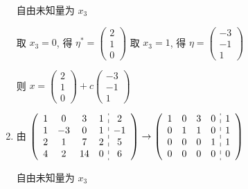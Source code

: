 \begin{enumerate}
                   自由未知量为 \( x_{3} \)

                   取 \( x_{3} = 0 \), 得 \( \eta^{*} = \begin{pmatrix}
                       2 \\
                       1 \\
                       0
                   \end{pmatrix} \) 取 \( x_{3} = 1 \), 得 \( \eta = \begin{pmatrix}
                       -3 \\
                       -1 \\
                       1
                   \end{pmatrix} \)

                   则 \( x = \begin{pmatrix}
                       2 \\
                       1 \\
                       0
                   \end{pmatrix} + c\begin{pmatrix}
                       -3 \\
                       -1 \\
                       1
                   \end{pmatrix} \)
             \item %
                   由 \( \left(\begin{array}{cccc:c}
                           1 & 0  & 3  & 1 & 2  \\
                           1 & -3 & 0  & 1 & -1 \\
                           2 & 1  & 7  & 2 & 5  \\
                           4 & 2  & 14 & 0 & 6
                       \end{array}\right)
                   \to
                   \left(\begin{array}{cccc:c}
                           1 & 0 & 3 & 0 & 1 \\
                           0 & 1 & 1 & 0 & 1 \\
                           0 & 0 & 0 & 1 & 1 \\
                           0 & 0 & 0 & 0 & 0
                       \end{array}\right) \)

                   自由未知量为 \( x_{3} \)


\end{enumerate}
